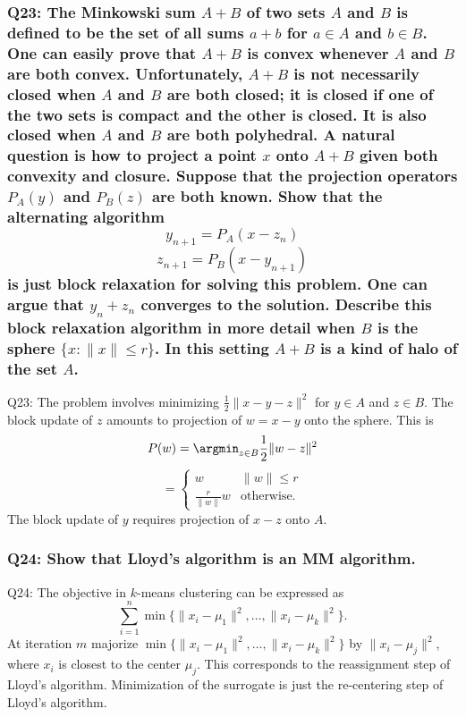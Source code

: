 \documentclass[8pt]{article}
\begin{document}
\subsubsection*{Q23: The Minkowski sum \( A + B \) of two sets \( A \) and \( B \) is defined to be the set of all sums \( a + b \) for \( a \in A \) and \( b \in B \). One can easily prove that \( A + B \) is convex whenever \( A \) and \( B \) are both convex. Unfortunately, \( A + B \) is not necessarily closed when \( A \) and \( B \) are both closed; it is closed if one of the two sets is compact and the other is closed. It is also closed when \( A \) and \( B \) are both polyhedral. A natural question is how to project a point \( x \) onto \( A + B \) given both convexity and closure. Suppose that the projection operators \( P_A(y) \) and \( P_B(z) \) are both known. Show that the alternating algorithm
\[
y_{n+1} = P_A(x - z_n)
\]
\[
z_{n+1} = P_B(x - y_{n+1})
\]
is just block relaxation for solving this problem. One can argue that \( y_n + z_n \) converges to the solution. Describe this block relaxation algorithm in more detail when \( B \) is the sphere \(\{x : \|x\| \leq r\}\). In this setting \( A + B \) is a kind of halo of the set \( A \).}

Q23: The problem involves minimizing \(\frac{1}{2} \|x - y - z\|^2\) for \( y \in A \) and \( z \in B \). The block update of \( z \) amounts to projection of \( w = x - y \) onto the sphere. This is
\[ 
P(w) = \argmin_{z \in B} \frac{1}{2} \|w - z\|^2 
\]
\[
= \begin{cases} 
w & \|w\| \leq r \\
\frac{r}{\|w\|} w & \text{otherwise}. 
\end{cases}
\]
\noindent The block update of \( y \) requires projection of \( x - z \) onto \( A \).

\subsubsection*{Q24: Show that Lloyd's algorithm is an MM algorithm.}

Q24: The objective in \( k \)-means clustering can be expressed as
\[
\sum_{i=1}^n \min \{\|x_i - \mu_1\|^2, \ldots, \|x_i - \mu_k\|^2\}.
\]
\noindent At iteration \( m \) majorize \(\min \{\|x_i - \mu_1\|^2, \ldots, \|x_i - \mu_k\|^2 \}\) by \(\|x_i - \mu_j\|^2 \), where \( x_i \) is closest to the center \(\mu_j \). This corresponds to the reassignment step of Lloyd's algorithm. Minimization of the surrogate is just the re-centering step of Lloyd's algorithm.
\end{document}

